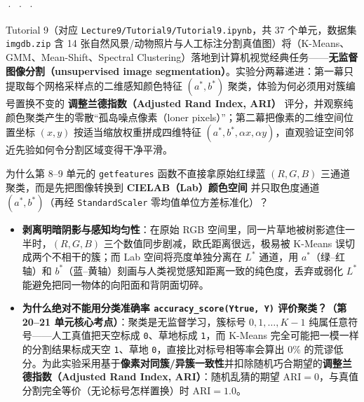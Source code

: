 

 ·  ·  · 



Tutorial 9（对应 \texttt{Lecture9/Tutorial9/Tutorial9.ipynb}，共 37 个单元，数据集 \texttt{imgdb.zip} 含 14 张自然风景/动物照片与人工标注分割真值图）将（K-Means、GMM、Mean-Shift、Spectral Clustering）落地到计算机视觉经典任务——\textbf{无监督图像分割（unsupervised image segmentation）}。实验分两幕递进：第一幕只提取每个网格采样点的二维感知颜色特征 $(a^*, b^*)$ 聚类，体验为何必须用对簇编号置换不变的 \textbf{调整兰德指数（Adjusted Rand Index, ARI）} 评分，并观察纯颜色聚类产生的零散“孤岛噪点像素（loner pixels）”；第二幕把像素的二维空间位置坐标 $(x, y)$ 按适当缩放权重拼成四维特征 $(a^*, b^*, \alpha x, \alpha y)$，直观验证空间邻近先验如何令分割区域变得干净平滑。



为什么第 8–9 单元的 \texttt{getfeatures} 函数不直接拿原始红绿蓝 $(R, G, B)$ 三通道聚类，而是先把图像转换到 \textbf{CIELAB（Lab）颜色空间} 并只取色度通道 $(a^*, b^*)$（再经 \texttt{StandardScaler} 零均值单位方差标准化）？
\begin{itemize}
\item \textbf{剥离明暗阴影与感知均匀性}：在原始 RGB 空间里，同一片草地被树影遮住一半时，$(R, G, B)$ 三个数值同步剧减，欧氏距离很远，极易被 K-Means 误切成两个不相干的簇；而 Lab 空间将亮度单独分离在 $L^*$ 通道，用 $a^*$（绿–红轴）和 $b^*$（蓝–黄轴）刻画与人类视觉感知距离一致的纯色度，丢弃或弱化 $L^*$ 能避免把同一物体的向阳面和背阴面切碎。
\item \textbf{为什么绝对不能用分类准确率 \texttt{accuracy\_score(Ytrue, Y)} 评价聚类？（第 20–21 单元核心考点）}：聚类是无监督学习，簇标号 $0, 1, \dots, K-1$ 纯属任意符号——人工真值把天空标成 \texttt{0}、草地标成 \texttt{1}，而 K-Means 完全可能把一模一样的分割结果标成天空 \texttt{1}、草地 \texttt{0}，直接比对标号相等率会算出 $0\%$ 的荒谬低分。为此实验采用基于\textbf{像素对同簇/异簇一致性}并扣除随机巧合期望的\textbf{调整兰德指数（Adjusted Rand Index, ARI）}：随机乱猜的期望 $\mathrm{ARI} = 0$，与真值分割完全等价（无论标号怎样置换）时 $\mathrm{ARI} = 1.0$。
\end{itemize}


